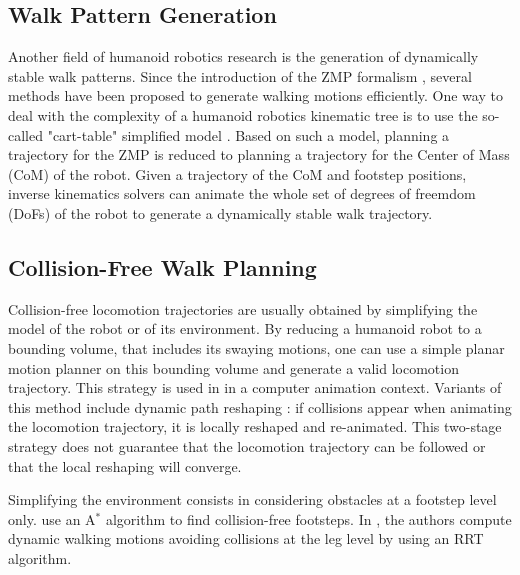 \documentclass{article}
\begin{document}
\subsection{Walk Pattern Generation}

Another  field of  humanoid  robotics research  is  the generation  of
dynamically stable  walk patterns. Since  the introduction of  the ZMP
formalism  \cite{vukobratovic1969contribution},  several  methods  have  been  proposed  to
generate  walking  motions efficiently.   One  way  to  deal with  the
complexity  of a  humanoid  robotics  kinematic tree  is  to use  the
so-called "cart-table" simplified model \cite{kajita2003biped}. Based on such a
model,  planning a trajectory  for the  ZMP is  reduced to  planning a
trajectory  for  the Center  of  Mass (CoM)  of  the  robot.  Given  a
trajectory  of  the CoM  and  footstep  positions, inverse  kinematics
solvers can animate  the whole set of degrees of freemdom (DoFs) of the  
robot to generate a dynamically stable walk trajectory.


\subsection{Collision-Free Walk Planning}

Collision-free  locomotion   trajectories  are  usually   obtained  by
simplifying the model of the  robot or of its environment. By reducing 
a  humanoid robot to a bounding volume, that includes its swaying motions,
one can  use a simple  planar motion planner  on this bounding  volume and
generate  a valid  locomotion  trajectory. This  strategy  is used  in
\cite{pettre20032} in a computer animation context. Variants of this method
include  dynamic path reshaping  \cite{yoshida-humanoids05}: if  collisions appear
when animating  the locomotion  trajectory, it is  locally reshaped
and re-animated.  This two-stage  strategy does not guarantee that the
locomotion trajectory can be followed or that the local reshaping will
converge.

Simplifying  the environment  consists in  considering obstacles  at a
footstep   level only.   \cite{kuffner2001footstep,chestnutt2005footstep,kuffner2005motion}
use   an  A$^{*}$   algorithm  to   find
collision-free   footsteps.    In   \cite{perrin2012fast},   the   authors   compute
dynamic walking motions avoiding collisions at the leg level
by using  an RRT algorithm. 
\end{document}
